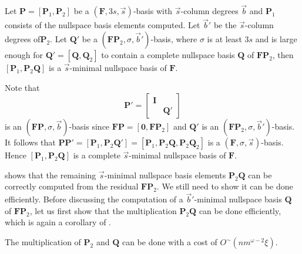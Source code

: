 \begin{lem}
\label{lem:continueComputingNullspaceBasisByColumns}Let $\mathbf{P}=\left[\mathbf{P}_{1},\mathbf{P}_{2}\right]$
be a $\left(\mathbf{F},3s,\vec{s}\right)$-basis with $\vec{s}$-column
degrees $\vec{b}$ and $\mathbf{P}_{1}$ consists of the nullspace
basis elements computed. Let $\vec{b}'$ be the $\vec{s}$-column
degrees of$\mathbf{P}_{2}$. Let $\mathbf{Q}'$ be a $\left(\mathbf{F}\mathbf{P}_{2},\sigma,\vec{b}'\right)$-basis,
where $\sigma$ is at least $3s$ and is large enough for $\mathbf{Q}'=\left[\mathbf{Q},\mathbf{Q}_{2}\right]$
to contain a complete nullspace basis $\mathbf{Q}$ of $\mathbf{F}\mathbf{P}_{2}$,
then $\left[\mathbf{P}_{1},\mathbf{P}_{2}\mathbf{Q}\right]$ is a
$\vec{s}$-minimal nullspace basis of $\mathbf{F}$.\end{lem}
\begin{pf}
Note that 
\[
\mathbf{P}'=\begin{bmatrix}\mathbf{I}\\
 & \mathbf{Q}'
\end{bmatrix}
\]
 is an $\left(\mathbf{F}\mathbf{P},\sigma,\vec{b}\right)$-basis since
$\mathbf{F}\mathbf{P}=\left[\mathbf{0},\mathbf{F}\mathbf{P}_{2}\right]$
and $\mathbf{Q}'$ is an $\left(\mathbf{F}\mathbf{P}_{2},\sigma,\vec{b}'\right)$-basis.
It follows that $\mathbf{P}\mathbf{P}'=\left[\mathbf{P}_{1},\mathbf{P}_{2}\mathbf{Q}'\right]=\left[\mathbf{P}_{1},\mathbf{P}_{2}\mathbf{Q},\mathbf{P}_{2}\mathbf{Q}_{2}\right]$
is a $\left(\mathbf{F},\sigma,\vec{s}\right)$-basis. Hence $\left[\mathbf{P}_{1},\mathbf{P}_{2}\mathbf{Q}\right]$
is a complete $\vec{s}$-minimal nullspace basis of $\mathbf{F}$.
\end{pf}
 shows that
the remaining $\vec{s}$-minimal nullspace basis elements $\mathbf{P}_{2}\mathbf{Q}$
can be correctly computed from the residual $\mathbf{F}\mathbf{P}_{2}$.
We still need to show it can be done efficiently. Before discussing
the computation of a $\vec{b}'$-minimal nullspace basis $\mathbf{Q}$
of $\mathbf{F}\mathbf{P}_{2}$, let us first show that the multiplication
$\mathbf{P}_{2}\mathbf{Q}$ can be done efficiently, which is again
a corollary of .
\begin{lem}
\label{cor:multiplyingP2Q}The multiplication of $\mathbf{P}_{2}$
and $\mathbf{Q}$ can be done with a cost of $O^{\sim}\left(nm^{\omega-2}\xi\right)$.\end{lem}
